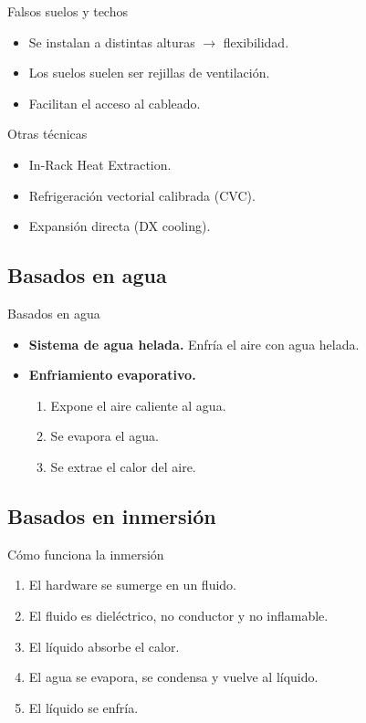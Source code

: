 \documentclass[aspectratio=169, compress]{beamer}
\begin{document}
\begin{frame}{Falsos suelos y techos}
    \begin{itemize}
        \item Se instalan a distintas alturas $\rightarrow$ flexibilidad.
        \item Los suelos suelen ser rejillas de ventilación.
        \item Facilitan el acceso al cableado.
    \end{itemize}
\end{frame}

\begin{frame}{Otras técnicas}
    \begin{itemize}
        \item In-Rack Heat Extraction.
        \item Refrigeración vectorial calibrada (CVC).
        \item Expansión directa (DX cooling).
    \end{itemize}
\end{frame}



\subsection{Basados en agua}

\begin{frame}{Basados en agua}
    \begin{itemize}
        \item \textbf{Sistema de agua helada.} Enfría el aire con agua helada.
        \item \textbf{Enfriamiento evaporativo.}
            \begin{enumerate}
                \item Expone el aire caliente al agua.
                \item Se evapora el agua.
                \item Se extrae el calor del aire.
            \end{enumerate}
    \end{itemize}
\end{frame}



\subsection{Basados en inmersión}

\begin{frame}{Cómo funciona la inmersión}
    \begin{enumerate}
        \item El hardware se sumerge en un fluido.
        \item El fluido es dieléctrico, no conductor y no inflamable.
        \item El líquido absorbe el calor.
        \item El agua se evapora, se condensa y vuelve al líquido.
        \item El líquido se enfría.
    \end{enumerate}
\end{frame}
\end{document}
